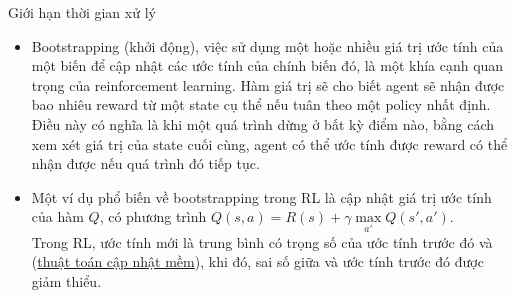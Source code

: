 \documentclass[10pt,aspectratio=169]{beamer}
\begin{document}
\begin{frame}{Giới hạn thời gian xử lý}{\subsecname}
\begin{itemize}
\setlength\itemsep{8pt}
\item Bootstrapping (khởi động), việc sử dụng một hoặc nhiều giá trị ước tính của một biến để cập nhật các ước tính của chính biến đó, là một khía cạnh quan trọng của reinforcement learning. Hàm giá trị sẽ cho biết agent sẽ nhận được bao nhiêu reward từ một state cụ thể nếu tuân theo một policy nhất định.\\
\vspace{4pt}
Điều này có nghĩa là khi một quá trình dừng ở bất kỳ điểm nào, bằng cách xem xét giá trị của state cuối cùng, agent có thể ước tính được reward có thể nhận được nếu quá trình đó tiếp tục.
\item Một ví dụ phổ biến về bootstrapping trong RL là cập nhật giá trị ước tính của hàm $ Q $, có phương trình $ Q(s,a) = R(s) + \gamma\max\limits_{a'} Q(s',a') $.\\
\vspace{4pt}
Trong RL, ước tính  mới là trung bình có trọng số của ước tính  trước đó và  (\hyperlink{softupdate}{thuật toán cập nhật mềm}), khi đó, sai số giữa  và ước tính  trước đó được giảm thiểu.
\end{itemize}
\end{frame}
\end{document}
